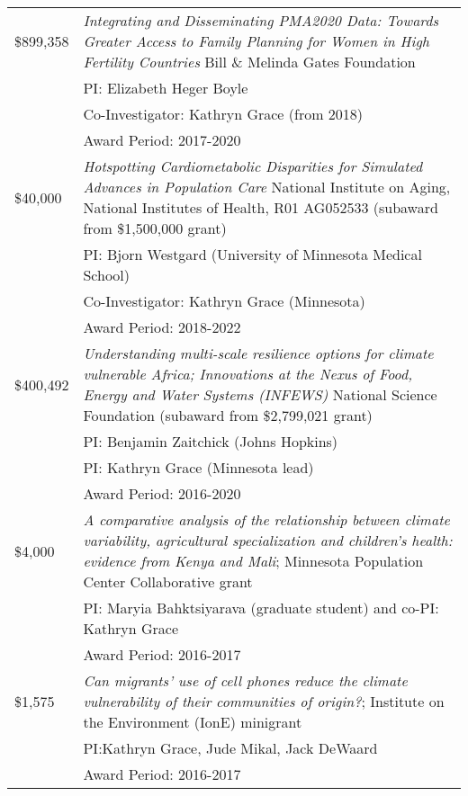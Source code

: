 \documentclass[11pt]{article} %
\begin{document}
\begin{tabular}{lp{11cm}}

\$899,358 & \emph{Integrating and Disseminating PMA2020 Data: Towards Greater Access to Family Planning for Women in High Fertility Countries} Bill \& Melinda Gates Foundation\\
&PI: Elizabeth Heger Boyle\\
&Co-Investigator: Kathryn Grace (from 2018)\\
&Award Period: 2017-2020 \\





\$40,000& \emph{Hotspotting Cardiometabolic Disparities for Simulated Advances in Population Care} National Institute on Aging, National Institutes of Health, R01 AG052533 (subaward from \$1,500,000 grant)\\
&PI: Bjorn Westgard (University of Minnesota Medical School)\\
&Co-Investigator: Kathryn Grace (Minnesota)\\
&Award Period: 2018-2022\\



\$400,492& \emph{Understanding multi-scale resilience options for climate vulnerable Africa; Innovations at the Nexus of Food, Energy and Water Systems (INFEWS)} National Science Foundation (subaward from \$2,799,021 grant)\\
&PI: Benjamin Zaitchick (Johns Hopkins)\\
&PI: Kathryn Grace (Minnesota lead)\\
&Award Period: 2016-2020\\



\$4,000& \emph{A comparative analysis of the relationship between climate variability, agricultural specialization and children's health:  evidence from Kenya and Mali}; Minnesota Population Center Collaborative grant\\
&PI: Maryia Bahktsiyarava (graduate student) and co-PI: Kathryn Grace\\
&Award Period: 2016-2017\\




\$1,575& \emph{Can migrants' use of cell phones reduce the climate vulnerability of their communities of origin?}; Institute on the Environment (IonE) minigrant\\
&PI:Kathryn Grace, Jude Mikal, Jack DeWaard\\
&Award Period: 2016-2017\\







\end{tabular}
\end{document}
